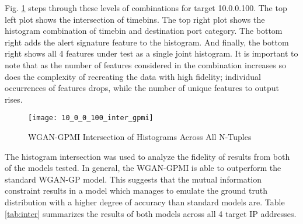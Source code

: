 Fig. \ref{fig:inter} steps through these levels of combinations for target 10.0.0.100. The top left plot shows the intersection of timebins. The top right plot shows the histogram combination of timebin and destination port category. The bottom right adds the alert signature feature to the histogram. And finally, the bottom right shows all 4 features under test as a single joint histogram. It is important to note that as the number of features considered in the combination increases so does the complexity of recreating the data with high fidelity; individual occurrences of features drops, while the number of unique features to output rises. 


\begin{figure}[!htbp]
	\centering
	\texttt{[image: 10\_0\_0\_100\_inter\_gpmi]}
	\caption{
		WGAN-GPMI Intersection of Histograms Across All N-Tuples
	}
	\label{fig:inter}
\end{figure}

The histogram intersection was used to analyze the fidelity of results from both of the models tested. In general, the WGAN-GPMI is able to outperform the standard WGAN-GP model. This suggests that the mutual information constraint results in a model which manages to emulate the ground truth distribution with a higher degree of accuracy than standard models are. Table \ref{tab:inter} summarizes the results of both models across all 4 target IP addresses. 


